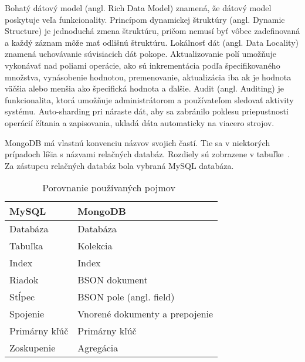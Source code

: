 Bohatý dátový model (angl. Rich Data Model) znamená, že dátový model poskytuje veľa funkcionality. Princípom dynamickej štruktúry (angl. Dynamic Structure) je jednoduchá zmena štruktúru, pričom nemusí byť vôbec zadefinovaná a každý záznam môže mať odlišnú štruktúru. Lokálnosť dát (angl. Data Locality) znamená uchovávanie súvisiacich dát pokope. Aktualizovanie polí umožňuje vykonávať nad poliami operácie, ako sú inkrementácia podľa špecifikovaného množstva, vynásobenie hodnotou, premenovanie, aktualizácia iba ak je hodnota väčšia alebo menšia ako špecifická hodnota a ďalšie. Audit (angl. Auditing) je funkcionalita, ktorá umožňuje administrátorom a používateľom sledovať aktivity systému.
Auto-sharding pri náraste dát, aby sa zabránilo poklesu priepustnosti operácií čítania a zapisovania, ukladá dáta automaticky na viacero strojov.

MongoDB má vlastnú konvenciu názvov svojich častí. Tie sa v niektorých prípadoch líšia s názvami relačných databáz. Rozdiely sú zobrazene v tabuľke~. Za zástupcu relačných databáz bola vybraná MySQL databáza. 

\begin{table}[H]
	\centering
	\caption{Porovnanie používaných pojmov~\cite{MongoDBvsMySQL2015}}
	\label{table:names_of_mongodb}
	\begin{tabular}{|l|l|}
		\hline
		\textbf{MySQL} & \textbf{MongoDB} \\ \hline
		Databáza & Databáza \\ \hline
		Tabuľka & Kolekcia \\ \hline
		Index & Index \\ \hline
		Riadok & BSON dokument \\ \hline
		Stĺpec & BSON pole (angl. field) \\ \hline
		Spojenie & Vnorené dokumenty a prepojenie \\ \hline
		Primárny kľúč & Primárny kľúč \\ \hline
		Zoskupenie & Agregácia \\ \hline
	\end{tabular}
\end{table}

